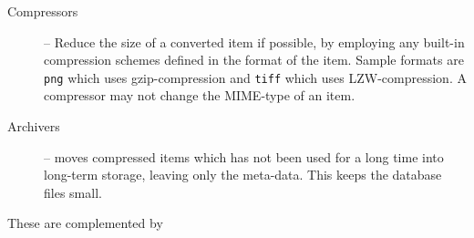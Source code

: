 \begin{description}
  
\item[Compressors] -- Reduce the size of a converted item if
  possible, by employing any built-in compression schemes
  defined in the format of the item.  Sample formats are
  \texttt{png} which uses gzip-compression and \texttt{tiff}
  which uses LZW-compression.  A compressor may not change
  the MIME-type of an item.
  
  
  
\item[Archivers] -- moves compressed items which has not
  been used for a long time into long-term storage, leaving
  only the meta-data.  This keeps the database files small.

  

\end{description}

These are complemented by

